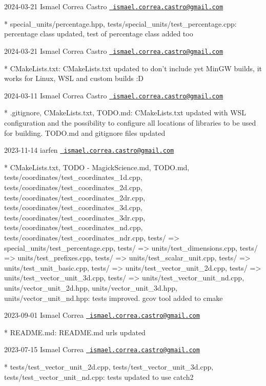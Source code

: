  2024-\/03-\/21 Ismael Correa Castro \href{mailto:ismael.correa.castro@gmail.com}{\texttt{ ismael.\+correa.\+castro@gmail.\+com}} \begin{DoxyVerb}* special_units/percentage.hpp,
tests/special_units/test_percentage.cpp: percentage class updated,
test of percentage class added too
\end{DoxyVerb}
 2024-\/03-\/21 Ismael Correa Castro \href{mailto:ismael.correa.castro@gmail.com}{\texttt{ ismael.\+correa.\+castro@gmail.\+com}} \begin{DoxyVerb}* CMakeLists.txt: CMakeLists.txt updated to don't include yet MinGW
builds, it works for Linux, WSL and custom builds :D
\end{DoxyVerb}
 2024-\/03-\/11 Ismael Correa Castro \href{mailto:ismael.correa.castro@gmail.com}{\texttt{ ismael.\+correa.\+castro@gmail.\+com}} \begin{DoxyVerb}* .gitignore, CMakeLists.txt, TODO.md: CMakeLists.txt updated with
WSL configuration and the possibility to configure all locations of
libraries to be used for building. TODO.md and gitignore files
updated
\end{DoxyVerb}
 2023-\/11-\/14 iarfen \href{mailto:ismael.correa.castro@gmail.com}{\texttt{ ismael.\+correa.\+castro@gmail.\+com}} \begin{DoxyVerb}* CMakeLists.txt, TODO - MagickScience.md, TODO.md,
tests/coordinates/test_coordinates_1d.cpp,
tests/coordinates/test_coordinates_2d.cpp,
tests/coordinates/test_coordinates_2dr.cpp,
tests/coordinates/test_coordinates_3d.cpp,
tests/coordinates/test_coordinates_3dr.cpp,
tests/coordinates/test_coordinates_nd.cpp,
tests/coordinates/test_coordinates_ndr.cpp, tests/{ =>
special_units}/test_percentage.cpp, tests/{ =>
units}/test_dimensions.cpp, tests/{ => units}/test_prefixes.cpp,
tests/{ => units}/test_scalar_unit.cpp, tests/{ =>
units}/test_unit_basic.cpp, tests/{ =>
units}/test_vector_unit_2d.cpp, tests/{ =>
units}/test_vector_unit_3d.cpp, tests/{ =>
units}/test_vector_unit_nd.cpp, units/vector_unit_2d.hpp,
units/vector_unit_3d.hpp, units/vector_unit_nd.hpp: tests improved.
gcov tool added to cmake
\end{DoxyVerb}
 2023-\/09-\/01 Ismael Correa \href{mailto:ismael.correa.castro@gmail.com}{\texttt{ ismael.\+correa.\+castro@gmail.\+com}} \begin{DoxyVerb}* README.md: README.md urls updated
\end{DoxyVerb}
 2023-\/07-\/15 Ismael Correa \href{mailto:ismael.correa.castro@gmail.com}{\texttt{ ismael.\+correa.\+castro@gmail.\+com}} \begin{DoxyVerb}* tests/test_vector_unit_2d.cpp, tests/test_vector_unit_3d.cpp,
tests/test_vector_unit_nd.cpp: tests updated to use catch2
\end{DoxyVerb}
